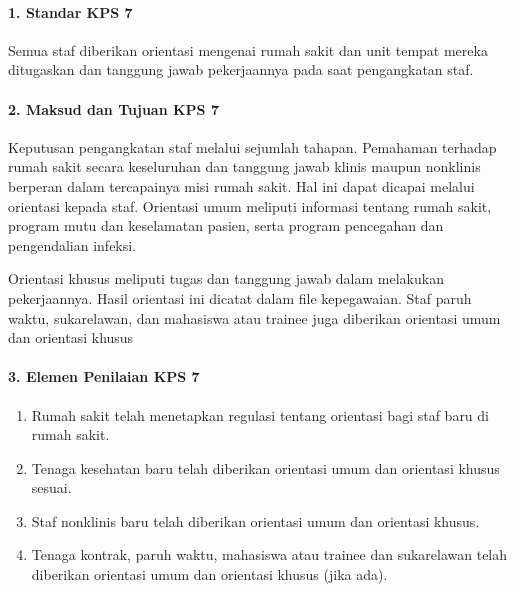 \documentclass[
]{book}
\providecommand{\tightlist}{%
  \setlength{\itemsep}{0pt}\setlength{\parskip}{0pt}}
\begin{document}
\hypertarget{standar-kps-7}{%
\paragraph*{1. Standar KPS 7}\label{standar-kps-7}}

Semua staf diberikan orientasi mengenai rumah sakit dan unit tempat mereka ditugaskan dan tanggung jawab pekerjaannya pada saat pengangkatan staf.

\hypertarget{maksud-dan-tujuan-kps-7}{%
\paragraph*{2. Maksud dan Tujuan KPS 7}\label{maksud-dan-tujuan-kps-7}}

Keputusan pengangkatan staf melalui sejumlah tahapan. Pemahaman terhadap rumah sakit secara keseluruhan dan tanggung jawab klinis maupun nonklinis berperan dalam tercapainya misi rumah sakit. Hal ini dapat dicapai melalui orientasi kepada staf.
Orientasi umum meliputi informasi tentang rumah sakit, program mutu dan keselamatan pasien, serta program pencegahan dan pengendalian infeksi.

Orientasi khusus meliputi tugas dan tanggung jawab dalam melakukan pekerjaannya. Hasil orientasi ini dicatat dalam file kepegawaian. Staf paruh waktu, sukarelawan, dan mahasiswa atau trainee juga diberikan orientasi umum dan orientasi khusus

\hypertarget{elemen-penilaian-kps-7}{%
\paragraph*{3. Elemen Penilaian KPS 7}\label{elemen-penilaian-kps-7}}

\begin{enumerate}
\def\labelenumi{\alph{enumi}.}
\tightlist
\item
  Rumah sakit telah menetapkan regulasi tentang orientasi bagi staf baru di rumah sakit.
\item
  Tenaga kesehatan baru telah diberikan orientasi umum dan orientasi khusus sesuai.
\item
  Staf nonklinis baru telah diberikan orientasi umum dan orientasi khusus.
\item
  Tenaga kontrak, paruh waktu, mahasiswa atau trainee dan sukarelawan telah diberikan orientasi umum dan orientasi khusus (jika ada).
\end{enumerate}
\end{document}
